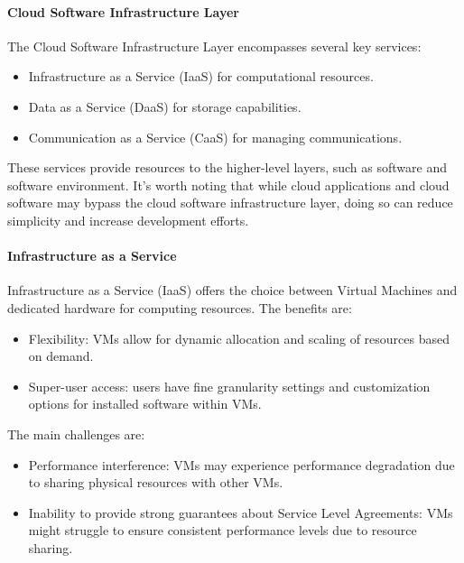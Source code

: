 \paragraph*{Cloud Software Infrastructure Layer}
The Cloud Software Infrastructure Layer encompasses several key services:
\begin{itemize}
    \item Infrastructure as a Service (IaaS) for computational resources.
    \item Data as a Service (DaaS) for storage capabilities.
    \item Communication as a Service (CaaS) for managing communications.
\end{itemize}
These services provide resources to the higher-level layers, such as software and software environment. 
It's worth noting that while cloud applications and cloud software may bypass the cloud software infrastructure layer, doing so can reduce simplicity and increase development efforts.

\paragraph*{Infrastructure as a Service}
Infrastructure as a Service (IaaS) offers the choice between Virtual Machines and dedicated hardware for computing resources.
The benefits are: 
\begin{itemize}
    \item Flexibility: VMs allow for dynamic allocation and scaling of resources based on demand.
    \item Super-user access: users have fine granularity settings and customization options for installed software within VMs.
\end{itemize}
The main challenges are: 
\begin{itemize}
    \item Performance interference: VMs may experience performance degradation due to sharing physical resources with other VMs.
    \item Inability to provide strong guarantees about Service Level Agreements: VMs might struggle to ensure consistent performance levels due to resource sharing.
\end{itemize}

